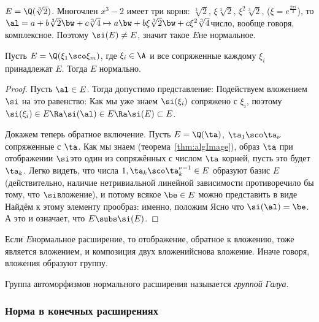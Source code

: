 \documentclass[a4paper]{article}
\begin{document}
\begin{ex}
$E=\Q(\sqrt[3]{2})$. Многочлен $x^3-2$ имеет три корня:
$\sqrt[3]{2}$, $\xi\sqrt[3]{2}$, $\xi^2\sqrt[3]{2}$, ($\xi=e^\frac{2\pi i}{3}$), то
$\al=a+b\sqrt[3]{2}\bw+c\sqrt[3]{4}\mapsto a\bw+b\xi\sqrt[3]{2}\bw+c\xi^2\sqrt[3]{4}$\т число, вообще говоря,
комплексное. Поэтому $\si(E)\neq E$, значит такое $E$\т не нормальное.
\end{ex}
\begin{theorem}
Пусть $E=\Q(\xi_1\sco \xi_m)$, где $\xi_i\in\A$ и все сопряженные каждому $\xi_i$
принадлежат $E$. Тогда $E$ нормально.
\end{theorem}
\begin{proof}
Пусть $\al\in E$. Тогда допустимо представление:
Подействуем вложением $\si$ на это равенство:
Как мы уже знаем $\si(\xi_i)$ сопряжено с $\xi_i$, поэтому $\si(\xi_i)\in E\Ra\si(\al)\in
E\Ra\si(E)\subset E$.

Докажем теперь обратное включение. Пусть
$E=\Q(\ta)$, $\ta_1\sco \ta_{\nu}$\т  сопряженные с $\ta$. Как мы знаем (теорема~\ref{thm:algImage}),
образ $\ta$ при отображении $\si$\т это один из сопряжённых с числом $\ta$ корней, пусть это будет $\ta_k$.
Легко видеть, что числа $1,\ta_k\sco \ta_k^{\nu-1}\in E$ образуют базис $E$ (действительно, наличие нетривиальной
линейной зависимости противоречило бы тому, что $\si$\т вложение), и потому всякое $\be\in E$ можно представить в виде
Найдём к этому элементу прообраз: именно, положим
Ясно что $\si(\al)=\be$. А это и означает, что $E\subs\si(E)$.
\end{proof}

\begin{imp}
Если $E$\т нормальное расширение, то отображение, обратное к вложению, тоже является вложением,
и композиция двух вложений\т снова вложение. Иначе говоря, вложения образуют группу.
\end{imp}

\begin{df}
Группа автоморфизмов нормального расширения называется \emph{группой Галуа}.
\end{df}

\subsubsection{Норма в конечных расширениях}
\end{document}
